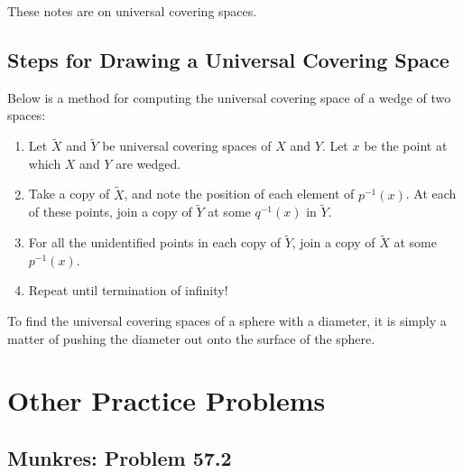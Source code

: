 \documentclass[10pt, oneside]{amsart}
\begin{document}
    These notes are on universal covering spaces.
    \newline

    \subsection{Steps for Drawing a Universal Covering Space}

    Below is a method for computing the universal covering space of a wedge of two spaces:

    \begin{enumerate}
    \item Let $\tilde{X}$ and $\tilde{Y}$ be universal covering spaces of $X$ and $Y$. Let $x$ be the point at which $X$ and $Y$ are wedged.
    \item Take a copy of $\tilde{X}$, and note the position of each element of $p^{-1}(x)$. At each of these points, join a copy of $\tilde{Y}$
      at some $q^{-1}(x)$ in $\tilde{Y}$.
    \item For all the unidentified points in each copy of $\tilde{Y}$, join a copy of $\tilde{X}$ at some $p^{-1}(x)$.
      \item Repeat until termination of infinity!
    \end{enumerate}

    To find the universal covering spaces of a sphere with a diameter, it is simply a matter of pushing the diameter out onto the surface of the sphere.

    \section{Other Practice Problems}

    \hrulefill

    \subsection{Munkres: Problem 57.2}

    \hrulefill

    


   
\end{document}
